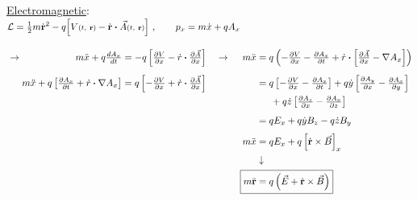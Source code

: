 \documentclass[12pt]{article}
\newcommand{\dotP}{\boldsymbol \cdot}		%
\begin{document}
\vspace{20pt} \noindent
\underline{Electromagnetic}:\\[15pt]
\(\begin{aligned}
    & \mathcal{L} = \tfrac{1}{2} m \dot{ \mathbf{r} }^2 
        - q \Big[ 
            V{\scriptstyle (t,\ \mathbf{r})} 
            - \dot{ \mathbf{r} } \dotP \vec{A}{\scriptstyle (t,\ \mathbf{r})} 
        \Big] \ ,
        \hspace{20pt} p_x = m \dot{x} + q A_x
        \\[10pt]
    & \rightarrow \begin{aligned}[t]
            m \ddot{x} + q \tfrac{d A_x}{d t} & = - q 
                \left[ 
                    \tfrac{\partial V}{\partial x} 
                    - \dot{r} \dotP \tfrac{\partial \vec{A} }{\partial x} 
                \right]
                \\[5pt]
            m \ddot{x} + q \left[ \tfrac{\partial A_x}{\partial t} + \dot{r} \dotP \nabla A_x \right] & 
                = q \left[ - \tfrac{\partial V}{\partial x} 
                + \dot{r} \dotP \tfrac{\partial \vec{A} }{\partial x} \right]
        \end{aligned}
        \hspace{10pt} \rightarrow \hspace{10pt}
        \begin{aligned}[t]
            m \ddot{x} & = q \left( 
                - \tfrac{\partial V}{\partial x} - \tfrac{\partial A_x}{\partial t}
                + \dot{r} \dotP \left[ \tfrac{\partial \vec{A}}{\partial x} - \nabla A_x \right] 
                \right)
                \\[5pt]
            & = q \left[ - \tfrac{\partial V}{\partial x} - \tfrac{\partial A_x}{\partial t} \right]
                + q \dot{y} \left[ \tfrac{\partial A_y }{\partial x} - \tfrac{\partial A_x }{\partial y} \right]
                \\
            & \hspace{15pt} + q \dot{z} \left[ \tfrac{\partial A_z }{\partial x} - \tfrac{\partial A_x }{\partial z} \right]
                \\[5pt]
            & = q E_x + q \dot{y} B_z - q \dot{z} B_y\\[3pt]
            m \ddot{x} & = q E_x + q \left[ \dot{ \mathbf{r} } \times \vec{B} \right]_x\\
            &\downarrow\\
            \Aboxed{ m \ddot{ \mathbf{r} } & = q \left( \vec{E} + \dot{ \mathbf{r} } \times \vec{B} \right) }
        \end{aligned}
\end{aligned}\)
\end{document}
